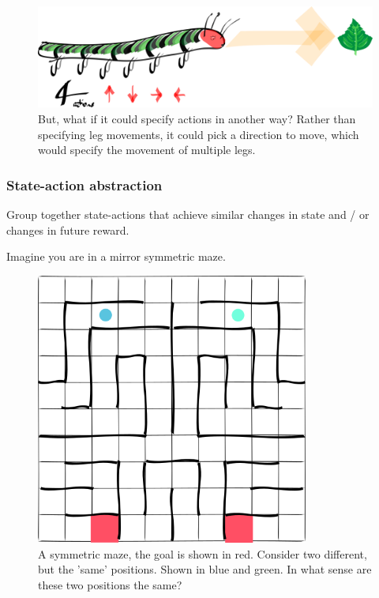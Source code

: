 \begin{figure}[h!]
\centering
\includegraphics[width=\textwidth,height=0.25\textheight]{../../pictures/drawings/full-caterpillar.png}
\caption{But, what if it could specify actions in another way? Rather than specifying leg movements, it could pick a direction to move, which would specify the movement of multiple legs.}
\end{figure}

\subsubsection{State-action abstraction}

Group together state-actions that achieve similar changes in state and / or changes in future reward.

Imagine you are in a mirror symmetric maze.

\begin{figure}[h!]
\centering
\includegraphics[width=0.8\textwidth,height=0.4\textheight]{../../pictures/drawings/maze.png}
\caption{A symmetric maze, the goal is shown in red.
Consider two different, but the 'same' positions. Shown in blue and green.
In what sense are these two positions the same?}
\end{figure}



